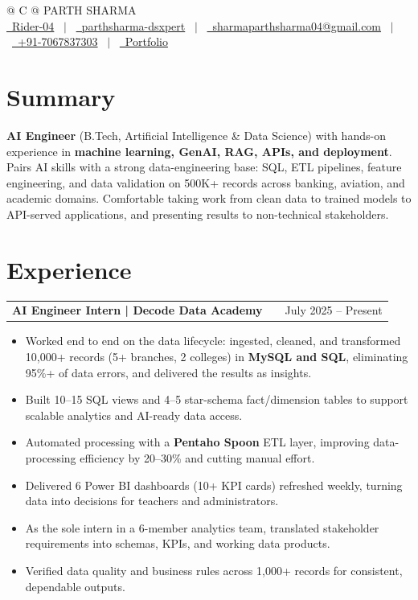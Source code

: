 \documentclass[a4paper,12pt]{article}
\makeatletter
\newenvironment{joblong}[2]
    {
    \begin{tabularx}{\linewidth}{@{}l X r@{}}
    \textbf{#1} & \hfill &  #2 \\[3.75pt]
    \end{tabularx}
    \begin{minipage}[t]{\linewidth}
    \begin{itemize}[nosep,after=\strut, leftmargin=1em, itemsep=3pt,label=--]
    }
    {
    \end{itemize}
    \end{minipage}
    }
\makeatother
\begin{document}
\pagestyle{empty}

\begin{tabularx}{\linewidth}{@{} C @{}}
\Huge{PARTH SHARMA} \\[7.5pt]
\href{https://github.com/Rider-04}{\raisebox{-0.05\height}\faGithub\ Rider-04} \ $|$ \
\href{https://www.linkedin.com/in/parthsharma-dsxpert}{\raisebox{-0.05\height}\faLinkedin\ parthsharma-dsxpert} \ $|$ \
\href{mailto:sharmaparthsharma04@gmail.com}{\raisebox{-0.05\height}\faEnvelope \ sharmaparthsharma04@gmail.com} \ $|$ \
\href{tel:+917067837303}{\raisebox{-0.05\height}\faMobile \ +91-7067837303} \ $|$ \
\href{https://parth-portfolio-virid.vercel.app/}{\raisebox{-0.05\height}\faGlobe \ Portfolio}\end{tabularx}


\section{Summary}
\textbf{AI Engineer} (B.Tech, Artificial Intelligence \& Data Science) with hands-on experience in \textbf{machine learning, GenAI, RAG, APIs, and deployment}. Pairs AI skills with a strong data-engineering base: SQL, ETL pipelines, feature engineering, and data validation on 500K+ records across banking, aviation, and academic domains. Comfortable taking work from clean data to trained models to API-served applications, and presenting results to non-technical stakeholders.

\section{Experience}

\begin{joblong}{AI Engineer Intern | Decode Data Academy}{July 2025 -- Present}
\item Worked end to end on the data lifecycle: ingested, cleaned, and transformed 10,000+ records (5+ branches, 2 colleges) in \textbf{MySQL and SQL}, eliminating 95\%+ of data errors, and delivered the results as insights.
\item Built 10--15 SQL views and 4--5 star-schema fact/dimension tables to support scalable analytics and AI-ready data access.
\item Automated processing with a \textbf{Pentaho Spoon} ETL layer, improving data-processing efficiency by 20--30\% and cutting manual effort.
\item Delivered 6 Power BI dashboards (10+ KPI cards) refreshed weekly, turning data into decisions for teachers and administrators.
\item As the sole intern in a 6-member analytics team, translated stakeholder requirements into schemas, KPIs, and working data products.
\item Verified data quality and business rules across 1,000+ records for consistent, dependable outputs.
\vspace{10pt}
\end{joblong}
\end{document}
